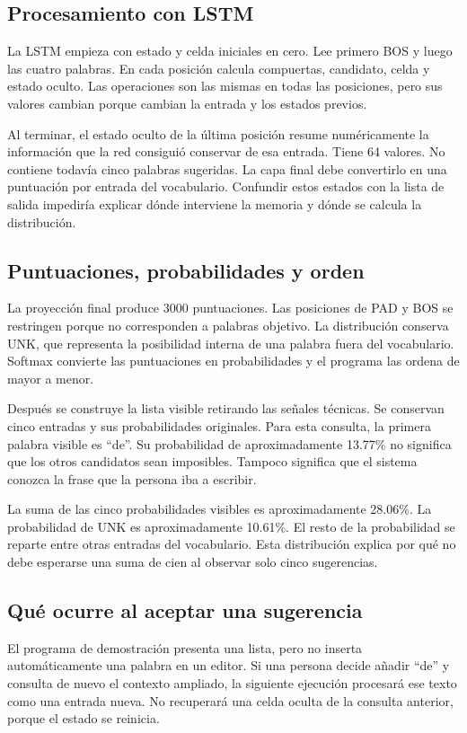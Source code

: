 \subsection{Procesamiento con LSTM}
La LSTM empieza con estado y celda iniciales en cero. Lee primero BOS y luego las cuatro palabras. En cada posición calcula compuertas, candidato, celda y estado oculto. Las operaciones son las mismas en todas las posiciones, pero sus valores cambian porque cambian la entrada y los estados previos.

Al terminar, el estado oculto de la última posición resume numéricamente la información que la red consiguió conservar de esa entrada. Tiene 64 valores. No contiene todavía cinco palabras sugeridas. La capa final debe convertirlo en una puntuación por entrada del vocabulario. Confundir estos estados con la lista de salida impediría explicar dónde interviene la memoria y dónde se calcula la distribución.

\subsection{Puntuaciones, probabilidades y orden}
La proyección final produce 3000 puntuaciones. Las posiciones de PAD y BOS se restringen porque no corresponden a palabras objetivo. La distribución conserva UNK, que representa la posibilidad interna de una palabra fuera del vocabulario. Softmax convierte las puntuaciones en probabilidades y el programa las ordena de mayor a menor.

Después se construye la lista visible retirando las señales técnicas. Se conservan cinco entradas y sus probabilidades originales. Para esta consulta, la primera palabra visible es ``de''. Su probabilidad de aproximadamente 13.77\% no significa que los otros candidatos sean imposibles. Tampoco significa que el sistema conozca la frase que la persona iba a escribir.

La suma de las cinco probabilidades visibles es aproximadamente 28.06\%. La probabilidad de UNK es aproximadamente 10.61\%. El resto de la probabilidad se reparte entre otras entradas del vocabulario. Esta distribución explica por qué no debe esperarse una suma de cien al observar solo cinco sugerencias.

\subsection{Qué ocurre al aceptar una sugerencia}
El programa de demostración presenta una lista, pero no inserta automáticamente una palabra en un editor. Si una persona decide añadir ``de'' y consulta de nuevo el contexto ampliado, la siguiente ejecución procesará ese texto como una entrada nueva. No recuperará una celda oculta de la consulta anterior, porque el estado se reinicia.

